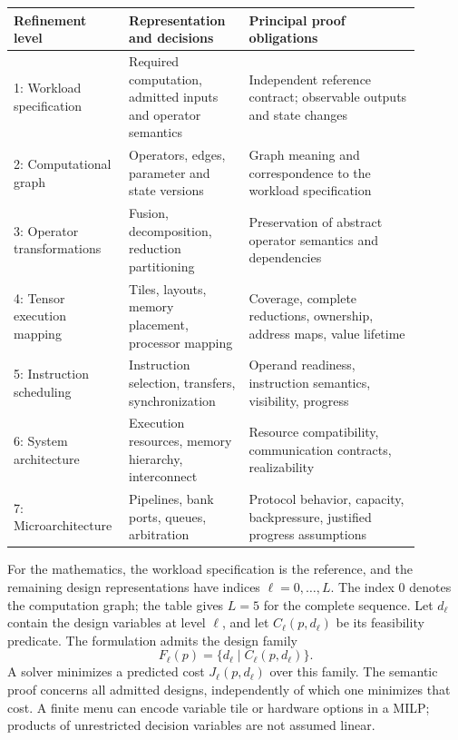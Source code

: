 \documentclass[11pt]{article}
\begin{document}
\begin{center}
\small
\begin{tabular}{p{0.20\linewidth}p{0.29\linewidth}p{0.40\linewidth}}
\toprule
Refinement level & Representation and decisions & Principal proof obligations \\
\midrule
1: Workload specification & Required computation, admitted inputs and operator semantics & Independent reference contract; observable outputs and state changes \\
2: Computational graph & Operators, edges, parameter and state versions & Graph meaning and correspondence to the workload specification \\
3: Operator transformations & Fusion, decomposition, reduction partitioning & Preservation of abstract operator semantics and dependencies \\
4: Tensor execution mapping & Tiles, layouts, memory placement, processor mapping & Coverage, complete reductions, ownership, address maps, value lifetime \\
5: Instruction scheduling & Instruction selection, transfers, synchronization & Operand readiness, instruction semantics, visibility, progress \\
6: System architecture & Execution resources, memory hierarchy, interconnect & Resource compatibility, communication contracts, realizability \\
7: Microarchitecture & Pipelines, bank ports, queues, arbitration & Protocol behavior, capacity, backpressure, justified progress assumptions \\
\bottomrule
\end{tabular}
\end{center}

For the mathematics, the workload specification is the reference, and the remaining design representations have indices $\ell=0,\ldots,L$. The index 0 denotes the computation graph; the table gives $L=5$ for the complete sequence. Let $d_\ell$ contain the design variables at level $\ell$, and let $C_\ell(p,d_\ell)$ be its feasibility predicate. The formulation admits the design family
\begin{equation}
 F_\ell(p)=\{d_\ell\mid C_\ell(p,d_\ell)\}.
 \label{eq:family}
\end{equation}
A solver minimizes a predicted cost $J_\ell(p,d_\ell)$ over this family. The semantic proof concerns all admitted designs, independently of which one minimizes that cost. A finite menu can encode variable tile or hardware options in a MILP; products of unrestricted decision variables are not assumed linear.
\end{document}
